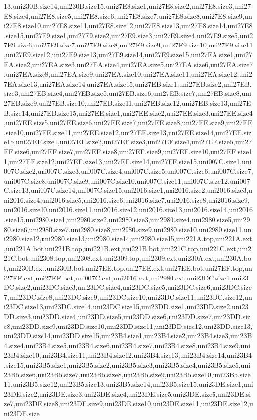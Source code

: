 13,uni230B.size14,uni230B.size15,uni27E8.size1,uni27E8.size2,uni27E8.size3,uni27E8.size4,uni27E8.size5,uni27E8.size6,uni27E8.size7,uni27E8.size8,uni27E8.size9,uni27E8.size10,uni27E8.size11,uni27E8.size12,uni27E8.size13,uni27E8.size14,uni27E8.size15,uni27E9.size1,uni27E9.size2,uni27E9.size3,uni27E9.size4,uni27E9.size5,uni27E9.size6,uni27E9.size7,uni27E9.size8,uni27E9.size9,uni27E9.size10,uni27E9.size11,uni27E9.size12,uni27E9.size13,uni27E9.size14,uni27E9.size15,uni27EA.size1,uni27EA.size2,uni27EA.size3,uni27EA.size4,uni27EA.size5,uni27EA.size6,uni27EA.size7,uni27EA.size8,uni27EA.size9,uni27EA.size10,uni27EA.size11,uni27EA.size12,uni27EA.size13,uni27EA.size14,uni27EA.size15,uni27EB.size1,uni27EB.size2,uni27EB.size3,uni27EB.size4,uni27EB.size5,uni27EB.size6,uni27EB.size7,uni27EB.size8,uni27EB.size9,uni27EB.size10,uni27EB.size11,uni27EB.size12,uni27EB.size13,uni27EB.size14,uni27EB.size15,uni27EE.size1,uni27EE.size2,uni27EE.size3,uni27EE.size4,uni27EE.size5,uni27EE.size6,uni27EE.size7,uni27EE.size8,uni27EE.size9,uni27EE.size10,uni27EE.size11,uni27EE.size12,uni27EE.size13,uni27EE.size14,uni27EE.size15,uni27EF.size1,uni27EF.size2,uni27EF.size3,uni27EF.size4,uni27EF.size5,uni27EF.size6,uni27EF.size7,uni27EF.size8,uni27EF.size9,uni27EF.size10,uni27EF.size11,uni27EF.size12,uni27EF.size13,uni27EF.size14,uni27EF.size15,uni007C.size1,uni007C.size2,uni007C.size3,uni007C.size4,uni007C.size5,uni007C.size6,uni007C.size7,uni007C.size8,uni007C.size9,uni007C.size10,uni007C.size11,uni007C.size12,uni007C.size13,uni007C.size14,uni007C.size15,uni2016.size1,uni2016.size2,uni2016.size3,uni2016.size4,uni2016.size5,uni2016.size6,uni2016.size7,uni2016.size8,uni2016.size9,uni2016.size10,uni2016.size11,uni2016.size12,uni2016.size13,uni2016.size14,uni2016.size15,uni2980.size1,uni2980.size2,uni2980.size3,uni2980.size4,uni2980.size5,uni2980.size6,uni2980.size7,uni2980.size8,uni2980.size9,uni2980.size10,uni2980.size11,uni2980.size12,uni2980.size13,uni2980.size14,uni2980.size15,uni221A.top,uni221A.ext,uni221A.bot,uni221B.top,uni221B.ext,uni221B.bot,uni221C.top,uni221C.ext,uni221C.bot,uni2308.top,uni2308.ext,uni2309.top,uni2309.ext,uni230A.ext,uni230A.bot,uni230B.ext,uni230B.bot,uni27EE.top,uni27EE.ext,uni27EE.bot,uni27EF.top,uni27EF.ext,uni27EF.bot,uni007C.ext,uni2016.ext,uni2980.ext,uni23DC.size1,uni23DC.size2,uni23DC.size3,uni23DC.size4,uni23DC.size5,uni23DC.size6,uni23DC.size7,uni23DC.size8,uni23DC.size9,uni23DC.size10,uni23DC.size11,uni23DC.size12,uni23DC.size13,uni23DC.size14,uni23DC.size15,uni23DD.size1,uni23DD.size2,uni23DD.size3,uni23DD.size4,uni23DD.size5,uni23DD.size6,uni23DD.size7,uni23DD.size8,uni23DD.size9,uni23DD.size10,uni23DD.size11,uni23DD.size12,uni23DD.size13,uni23DD.size14,uni23DD.size15,uni23B4.size1,uni23B4.size2,uni23B4.size3,uni23B4.size4,uni23B4.size5,uni23B4.size6,uni23B4.size7,uni23B4.size8,uni23B4.size9,uni23B4.size10,uni23B4.size11,uni23B4.size12,uni23B4.size13,uni23B4.size14,uni23B4.size15,uni23B5.size1,uni23B5.size2,uni23B5.size3,uni23B5.size4,uni23B5.size5,uni23B5.size6,uni23B5.size7,uni23B5.size8,uni23B5.size9,uni23B5.size10,uni23B5.size11,uni23B5.size12,uni23B5.size13,uni23B5.size14,uni23B5.size15,uni23DE.size1,uni23DE.size2,uni23DE.size3,uni23DE.size4,uni23DE.size5,uni23DE.size6,uni23DE.size7,uni23DE.size8,uni23DE.size9,uni23DE.size10,uni23DE.size11,uni23DE.size12,uni23DE.size